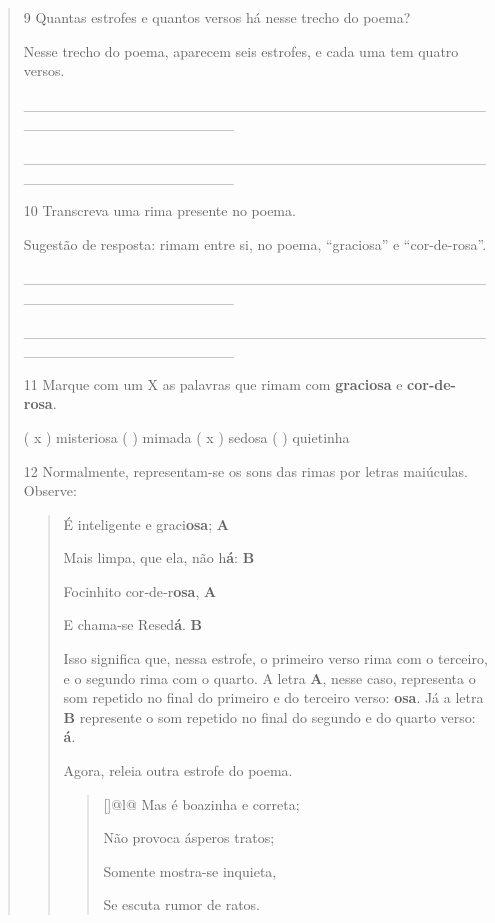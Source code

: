 \begin{boxlist}
{{\begin{quote}
\num{9} Quantas estrofes e quantos versos há nesse trecho do poema?

Nesse trecho do poema, aparecem seis estrofes, e cada uma tem quatro versos.

\_\_\_\_\_\_\_\_\_\_\_\_\_\_\_\_\_\_\_\_\_\_\_\_\_\_\_\_\_\_\_\_\_\_\_\_\_\_\_\_\_\_\_\_\_\_\_\_\_\_\_\_\_\_\_\_\_\_\_\_\_\_\_\_

\_\_\_\_\_\_\_\_\_\_\_\_\_\_\_\_\_\_\_\_\_\_\_\_\_\_\_\_\_\_\_\_\_\_\_\_\_\_\_\_\_\_\_\_\_\_\_\_\_\_\_\_\_\_\_\_\_\_\_\_\_\_\_\_

\num{10} Transcreva uma rima presente no poema.

Sugestão de resposta: rimam entre si, no poema, ``graciosa'' e ``cor-de-rosa''.

\_\_\_\_\_\_\_\_\_\_\_\_\_\_\_\_\_\_\_\_\_\_\_\_\_\_\_\_\_\_\_\_\_\_\_\_\_\_\_\_\_\_\_\_\_\_\_\_\_\_\_\_\_\_\_\_\_\_\_\_\_\_\_\_

\_\_\_\_\_\_\_\_\_\_\_\_\_\_\_\_\_\_\_\_\_\_\_\_\_\_\_\_\_\_\_\_\_\_\_\_\_\_\_\_\_\_\_\_\_\_\_\_\_\_\_\_\_\_\_\_\_\_\_\_\_\_\_\_

\num{11} Marque com um X as palavras que rimam com \textbf{graciosa} e
\textbf{cor-de-rosa}.

( x ) misteriosa ( ) mimada ( x ) sedosa ( ) quietinha

\num{12} Normalmente, representam-se os sons das rimas por letras maiúculas. Observe:

\begin{quote}
É inteligente e graci\textbf{osa}; \textbf{A}

Mais limpa, que ela, não h\textbf{á}: \textbf{B}

Focinhito cor‑de‑r\textbf{osa}, \textbf{A}

E chama‑se Resed\textbf{á}. \textbf{B}

Isso significa que, nessa estrofe, o primeiro verso rima com o terceiro, e o segundo rima com o quarto. A letra \textbf{A}, nesse caso, representa o som repetido no final do primeiro e do terceiro verso: \textbf{osa}. Já a letra \textbf{B} represente o som repetido no final do segundo e do quarto verso: \textbf{á}.

Agora, releia outra estrofe do poema.

\begin{quote}[]{@{}l@{}}
Mas é boazinha e correta;

Não provoca ásperos tratos;

Somente mostra-se inquieta,

Se escuta rumor de ratos.\strut
\end{quote}


\end{quote}
\end{quote}}}
\end{boxlist}

